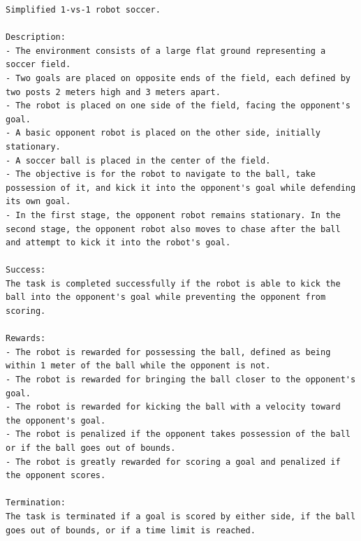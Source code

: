 \begin{lstlisting}[language={}]
Simplified 1-vs-1 robot soccer.

Description:
- The environment consists of a large flat ground representing a soccer field.
- Two goals are placed on opposite ends of the field, each defined by two posts 2 meters high and 3 meters apart.  
- The robot is placed on one side of the field, facing the opponent's goal.
- A basic opponent robot is placed on the other side, initially stationary.
- A soccer ball is placed in the center of the field.
- The objective is for the robot to navigate to the ball, take possession of it, and kick it into the opponent's goal while defending its own goal.
- In the first stage, the opponent robot remains stationary. In the second stage, the opponent robot also moves to chase after the ball and attempt to kick it into the robot's goal.

Success:
The task is completed successfully if the robot is able to kick the ball into the opponent's goal while preventing the opponent from scoring.

Rewards:
- The robot is rewarded for possessing the ball, defined as being within 1 meter of the ball while the opponent is not.
- The robot is rewarded for bringing the ball closer to the opponent's goal.
- The robot is rewarded for kicking the ball with a velocity toward the opponent's goal.
- The robot is penalized if the opponent takes possession of the ball or if the ball goes out of bounds.
- The robot is greatly rewarded for scoring a goal and penalized if the opponent scores.

Termination:
The task is terminated if a goal is scored by either side, if the ball goes out of bounds, or if a time limit is reached.
\end{lstlisting}
